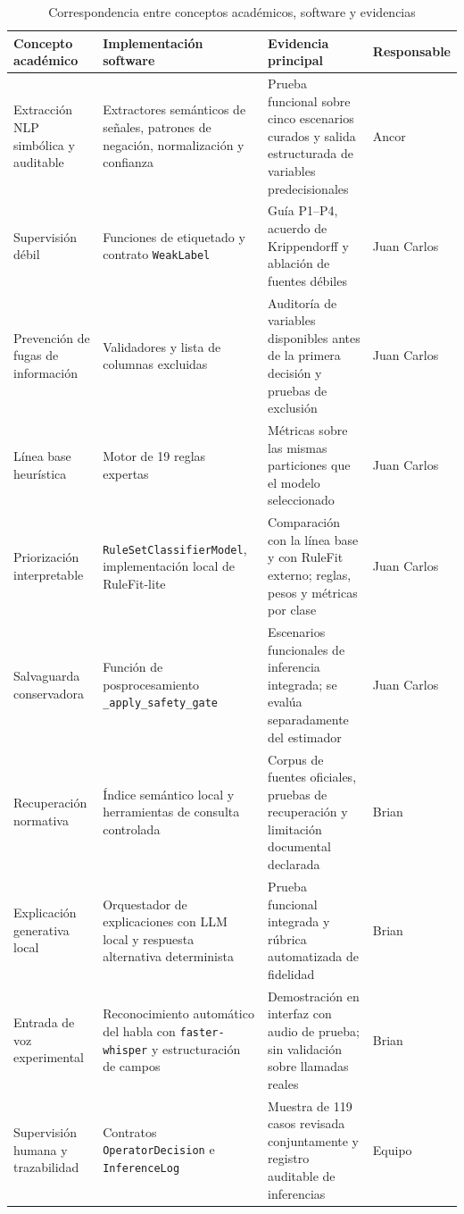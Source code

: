 \begin{table}[htbp]
\centering
\caption{Correspondencia entre conceptos académicos, software y evidencias}
\label{tab:anexof-correspondencia}
\scriptsize
\renewcommand{\arraystretch}{1.15}
\begin{tabularx}{\textwidth}{|p{2.8cm}|p{3.5cm}|X|p{2.2cm}|}
\hline
\textbf{Concepto académico} & \textbf{Implementación software} & \textbf{Evidencia principal} & \textbf{Responsable} \\ \hline
Extracción NLP simbólica y auditable & Extractores semánticos de señales, patrones de negación, normalización y confianza & Prueba funcional sobre cinco escenarios curados y salida estructurada de variables predecisionales & Ancor \\ \hline
Supervisión débil & Funciones de etiquetado y contrato \texttt{WeakLabel} & Guía P1--P4, acuerdo de Krippendorff y ablación de fuentes débiles & Juan Carlos \\ \hline
Prevención de fugas de información & Validadores y lista de columnas excluidas & Auditoría de variables disponibles antes de la primera decisión y pruebas de exclusión & Juan Carlos \\ \hline
Línea base heurística & Motor de 19 reglas expertas & Métricas sobre las mismas particiones que el modelo seleccionado & Juan Carlos \\ \hline
Priorización interpretable & \texttt{RuleSetClassifierModel}, implementación local de RuleFit-lite & Comparación con la línea base y con RuleFit externo; reglas, pesos y métricas por clase & Juan Carlos \\ \hline
Salvaguarda conservadora & Función de posprocesamiento \texttt{\_apply\_safety\_gate} & Escenarios funcionales de inferencia integrada; se evalúa separadamente del estimador & Juan Carlos \\ \hline
Recuperación normativa & Índice semántico local y herramientas de consulta controlada & Corpus de fuentes oficiales, pruebas de recuperación y limitación documental declarada & Brian \\ \hline
Explicación generativa local & Orquestador de explicaciones con LLM local y respuesta alternativa determinista & Prueba funcional integrada y rúbrica automatizada de fidelidad & Brian \\ \hline
Entrada de voz experimental & Reconocimiento automático del habla con \texttt{faster-whisper} y estructuración de campos & Demostración en interfaz con audio de prueba; sin validación sobre llamadas reales & Brian \\ \hline
Supervisión humana y trazabilidad & Contratos \texttt{OperatorDecision} e \texttt{InferenceLog} & Muestra de 119 casos revisada conjuntamente y registro auditable de inferencias & Equipo \\ \hline
\end{tabularx}
\end{table}

